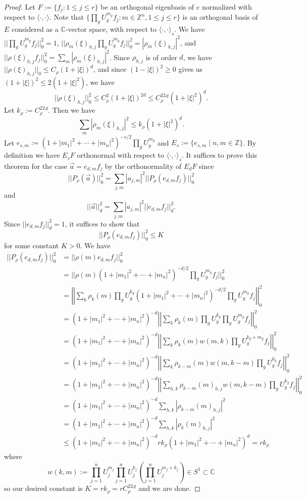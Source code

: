 \documentclass[10pt]{article}
\theoremstyle{remark}
\theoremstyle{definition}
\begin{document}
\begin{proof}
Let $F:=\{f_j:1\le j\le r\}$ be an orthogonal eigenbasis of $e$ normalized
with respect to $\langle\cdot,\cdot\rangle$.
Note that $\{\prod_gU_g^{m_g}f_j:m\in\mathbb Z^n,1\le j\le r\}$
is an orthogonal basis of $E$
considered as a $\mathbb C$-vector space, with respect to
$\langle\cdot,\cdot\rangle_s$. We have
$||\prod_gU_g^{m_g}f_j||_0^2=1$,
$||\rho_m(\xi)_{h,j}\prod_gU_g^{m_g}f_j||_0^2=|\rho_m(\xi)_{h,j}|^2$,
and $||\rho(\xi)_{h,j}f_j||_0^2=\sum_m|\rho_m(\xi)_{h,j}|^2$.
Since $\rho_{h,j}$ is of order $d$, we have
$||\rho(\xi)_{h,j}||_0\le C_{\rho}(1+|\xi|)^d$, and
since $(1-|\xi|)^2\ge 0$ gives us $(1+|\xi|)^2\le 2(1+|\xi|^2)$, we have
$$||\rho(\xi)_{h,j}||_0^2
\le C_{\rho}^2(1+|\xi|)^{2d}\le C_{\rho}^22^d(1+|\xi|^2)^d.$$
Let $k_{\rho}:=C_{\rho}^22^d$. Then we have
$$\sum_m|\rho_m(\xi)_{h,j}|^2\le k_{\rho}(1+|\xi|^2)^d.$$
Let $e_{s,m}:=(1+|m_1|^2+\cdots+|m_n|^2)^{-s/2}\prod_gU_g^{m_g}$ and
$E_s:=\{e_{s,m}\mid n,m\in\mathbb Z\}$. By definition we have $E_sF$
orthonormal with respect to $\langle\cdot,\cdot\rangle_s$. It suffices to
prove this theorem for the case $\vec{a}=e_{d,m}f_j$
by the orthonormality of $E_dF$
since
$$||P_{\rho}(\vec{a})||_0^2=\sum_{j,m}|a_{j,m}|^2
||P_{\rho}(e_{d,m}f_j)||_0^2$$
and
$$||\vec{a}||_d^2=\sum_{j,m}|a_{j,m}|^2||e_{d,m}f_j||_d^2.$$
Since $||e_{d,m}f_j||_d^2=1$, it suffices to show that
$$||P_{\rho}(e_{d,m}f_j)||_0^2\le K$$ for some constant $K>0$.
We have
\begin{align*}
||P_{\rho}(e_{d,m}f_j)||_0^2
&= ||\rho(m)e_{d,m}f_j||_0^2 \\
&= ||\rho(m)(1+|m_1|^2+\cdots+|m_n|^2)^{-d/2}\prod_gU_g^{m_g}f_j||_0^2 \\
&= \left|\left|\sum_k
\rho_k(m)\prod_gU_g^{k_g}(1+|m_1|^2+\cdots+|m_n|^2)^{-d/2}\prod_gU_g^{m_g}f_j
\right|\right|_0^2 \\
&= (1+|m_1|^2+\cdots+|m_n|^2)^{-d}\left|\left|\sum_k
\rho_k(m)\prod_gU_g^{k_g}\prod_gU_g^{m_g}f_j\right|\right|_0^2 \\
&= (1+|m_1|^2+\cdots+|m_n|^2)^{-d}\left|\left|\sum_k
\rho_k(m)w(m,k)\prod_gU_g^{k_g+m_g}f_j
\right|\right|_0^2 \\
&= (1+|m_1|^2+\cdots+|m_n|^2)^{-d}\left|\left|\sum_k
\rho_{k-m}(m)w(m,k-m)\prod_gU_g^{k_g} f_j
\right|\right|_0^2 \\
&= (1+|m_1|^2+\cdots+|m_n|^2)^{-d}\left|\left|\sum_{h,k}
\rho_{k-m}(m)_{h,j}w(m,k-m)\prod_gU_g^{k_g} f_j
\right|\right|_0^2 \\
&= (1+|m_1|^2+\cdots+|m_n|^2)^{-d}
\sum_{h,k}|\rho_{k-m}(m)_{h,j}|^2 \\
&= (1+|m_1|^2+\cdots+|m_n|^2)^{-d}
\sum_{h,k}|\rho_k(m)_{h,j}|^2 \\
&\le (1+|m_1|^2+\cdots+|m_n|^2)^{-d}rk_{\rho}(1+|m_1|^2+\cdots+|m_n|^2)^d
=rk_{\rho}
\end{align*}
where $$w(k,m):=\prod_{j=1}^nU_j^{m_j}\prod_{j=1}^nU_j^{k_j}
\left(\prod_{j=1}^nU_j^{m_j+k_j}\right)\in S^1\subset\mathbb C$$
so our desired constant is $K=rk_{\rho}=rC_{\rho}^22^d$ and we are done.
\end{proof}
\end{document}
